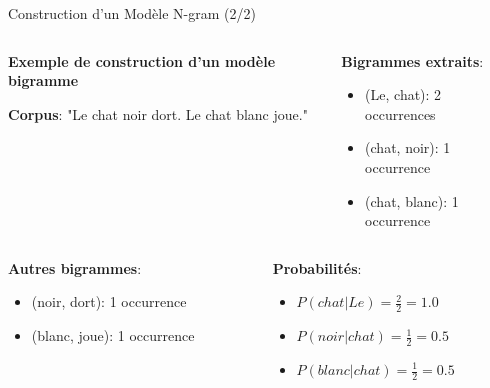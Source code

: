 \documentclass[aspectratio=169,11pt]{beamer}
\begin{document}
\begin{frame}{Construction d'un Modèle N-gram (2/2)}
    \begin{columns}
        \begin{column}{0.5\textwidth}
            \textbf{Exemple de construction d'un modèle bigramme}
            
            \textbf{Corpus}: "Le chat noir dort. Le chat blanc joue."
        \end{column}
        \begin{column}{0.5\textwidth}
            \textbf{Bigrammes extraits}:
            \begin{itemize}
                \item (Le, chat): 2 occurrences
                \item (chat, noir): 1 occurrence
                \item (chat, blanc): 1 occurrence
            \end{itemize}
        \end{column}
    \end{columns}
    
    \begin{columns}
        \begin{column}{0.5\textwidth}
            \textbf{Autres bigrammes}:
            \begin{itemize}
                \item (noir, dort): 1 occurrence
                \item (blanc, joue): 1 occurrence
            \end{itemize}
        \end{column}
        \begin{column}{0.5\textwidth}
            \textbf{Probabilités}:
            \begin{itemize}
                \item $P(chat|Le) = \frac{2}{2} = 1.0$
                \item $P(noir|chat) = \frac{1}{2} = 0.5$
                \item $P(blanc|chat) = \frac{1}{2} = 0.5$
            \end{itemize}
        \end{column}
    \end{columns}
\end{frame}
\end{document}
